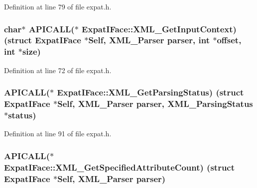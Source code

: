 Definition at line 79 of file expat.\+h.

\subsubsection[{\texorpdfstring{X\+M\+L\+\_\+\+Get\+Input\+Context}{XML_GetInputContext}}]{ char$\ast$ A\+P\+I\+C\+A\+LL($\ast$ Expat\+I\+Face\+::\+X\+M\+L\+\_\+\+Get\+Input\+Context) (struct {\bf Expat\+I\+Face} $\ast$Self, {\bf X\+M\+L\+\_\+\+Parser} parser, {\bf int} $\ast${\bf offset}, {\bf int} $\ast${\bf size})}\hypertarget{struct_expat_i_face_a86eb12fae888996bde1a003f3c8a4469}{}\label{struct_expat_i_face_a86eb12fae888996bde1a003f3c8a4469}


Definition at line 72 of file expat.\+h.

\subsubsection[{\texorpdfstring{X\+M\+L\+\_\+\+Get\+Parsing\+Status}{XML_GetParsingStatus}}]{ A\+P\+I\+C\+A\+LL($\ast$ Expat\+I\+Face\+::\+X\+M\+L\+\_\+\+Get\+Parsing\+Status) (struct {\bf Expat\+I\+Face} $\ast$Self, {\bf X\+M\+L\+\_\+\+Parser} parser, {\bf X\+M\+L\+\_\+\+Parsing\+Status} $\ast${\bf status})}\hypertarget{struct_expat_i_face_a080255406738979aca3b9548f6c2966c}{}\label{struct_expat_i_face_a080255406738979aca3b9548f6c2966c}


Definition at line 91 of file expat.\+h.

\subsubsection[{\texorpdfstring{X\+M\+L\+\_\+\+Get\+Specified\+Attribute\+Count}{XML_GetSpecifiedAttributeCount}}]{ A\+P\+I\+C\+A\+LL($\ast$ Expat\+I\+Face\+::\+X\+M\+L\+\_\+\+Get\+Specified\+Attribute\+Count) (struct {\bf Expat\+I\+Face} $\ast$Self, {\bf X\+M\+L\+\_\+\+Parser} parser)}\hypertarget{struct_expat_i_face_a7b26f7dc79c56aea8491af2dc28430af}{}\label{struct_expat_i_face_a7b26f7dc79c56aea8491af2dc28430af}


